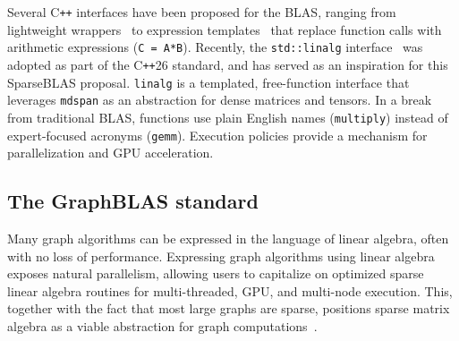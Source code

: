 \documentclass[manuscript,review]{acmart}
\newcommand{\cplusplus}{C\texttt{++}\xspace}
\newcommand{\cppstd}[1]{C\texttt{++}#1\xspace}
\begin{document}
Several \cplusplus interfaces have been proposed for the BLAS,
ranging from lightweight wrappers~\cite{gates2017cpp} to
expression templates~\cite{siek1998matrix,boost_ublas,eigen} that replace
function calls with arithmetic expressions (\verb+C = A*B+).
Recently, the \verb+std::linalg+ interface~\cite{hoemmen2023linalg}
was adopted as part of the
\cppstd{26} standard, and has served as an inspiration
for this SparseBLAS proposal.
\texttt{linalg} is a templated, free-function interface that leverages
\texttt{mdspan} as an
abstraction for dense matrices and tensors.
In a break from traditional
BLAS, functions use plain English names (\verb+multiply+) instead
of expert-focused acronyms (\verb+gemm+). Execution policies provide
a mechanism for parallelization and GPU acceleration.




\subsection{The GraphBLAS standard}

Many graph algorithms can be expressed in the language of linear algebra, often with no loss of performance. Expressing graph algorithms using linear algebra exposes natural parallelism, allowing users to capitalize on optimized sparse linear algebra routines for multi-threaded, GPU, and multi-node execution. This, together with the fact that most large graphs are sparse, positions sparse matrix algebra as a viable abstraction for graph computations~\cite{kepner2011graph, bulucc2011combinatorial}. 
\end{document}
